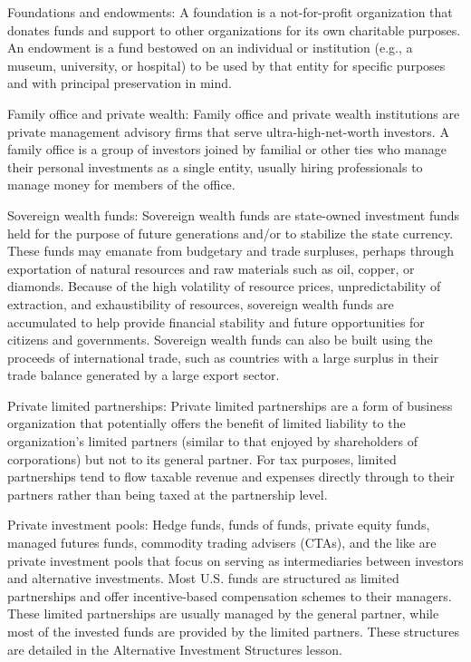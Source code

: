 \documentclass[11pt]{article}
\begin{document}
Foundations and endowments: A foundation is a not-for-profit organization that donates funds and support to other organizations for its own charitable purposes. An endowment is a fund bestowed on an individual or institution (e.g., a museum, university, or hospital) to be used by that entity for specific purposes and with principal preservation in mind.

Family office and private wealth: Family office and private wealth institutions are private management advisory firms that serve ultra-high-net-worth investors. A family office is a group of investors joined by familial or other ties who manage their personal investments as a single entity, usually hiring professionals to manage money for members of the office.

Sovereign wealth funds: Sovereign wealth funds are state-owned investment funds held for the purpose of future generations and/or to stabilize the state currency. These funds may emanate from budgetary and trade surpluses, perhaps through exportation of natural resources and raw materials such as oil, copper, or diamonds. Because of the high volatility of resource prices, unpredictability of extraction, and exhaustibility of resources, sovereign wealth funds are accumulated to help provide financial stability and future opportunities for citizens and governments. Sovereign wealth funds can also be built using the proceeds of international trade, such as countries with a large surplus in their trade balance generated by a large export sector.

Private limited partnerships: Private limited partnerships are a form of business organization that potentially offers the benefit of limited liability to the organization's limited partners (similar to that enjoyed by shareholders of corporations) but not to its general partner. For tax purposes, limited partnerships tend to flow taxable revenue and expenses directly through to their partners rather than being taxed at the partnership level.

Private investment pools: Hedge funds, funds of funds, private equity funds, managed futures funds, commodity trading advisers (CTAs), and the like are private investment pools that focus on serving as intermediaries between investors and alternative investments. Most U.S. funds are structured as limited partnerships and offer incentive-based compensation schemes to their managers. These limited partnerships are usually managed by the general partner, while most of the invested funds are provided by the limited partners. These structures are detailed in the Alternative Investment Structures lesson.
\end{document}
